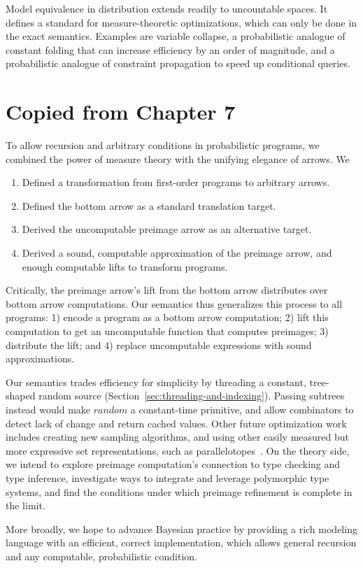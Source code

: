 Model equivalence in distribution extends readily to uncountable spaces. It defines a standard for measure-theoretic optimizations, which can only be done in the exact semantics. Examples are variable collapse, a probabilistic analogue of constant folding that can increase efficiency by an order of magnitude, and a probabilistic analogue of constraint propagation to speed up conditional queries.

\section{Copied from Chapter 7}

To allow recursion and arbitrary conditions in probabilistic programs, we combined the power of measure theory with the unifying elegance of arrows. We
\begin{enumerate}
	\item Defined a transformation from first-order programs to arbitrary arrows.
	\item Defined the bottom arrow as a standard translation target.
	\item Derived the uncomputable preimage arrow as an alternative target.
	\item Derived a sound, computable approximation of the preimage arrow, and enough computable lifts to transform programs.
\end{enumerate}
Critically, the preimage arrow's lift from the bottom arrow distributes over bottom arrow computations.
Our semantics thus generalizes this process to all programs: 1) encode a program as a bottom arrow computation; 2) lift this computation to get an uncomputable function that computes preimages; 3) distribute the lift; and 4) replace uncomputable expressions with sound approximations.

Our semantics trades efficiency for simplicity by threading a constant, tree-shaped random source (Section~\ref{sec:threading-and-indexing}).
Passing subtrees instead would make $random$ a constant-time primitive, and allow combinators to detect lack of change and return cached values.
Other future optimization work includes creating new sampling algorithms, and using other easily measured but more expressive set representations, such as parallelotopes~\cite{cit:amato-2012tcs-parallelotopes}.
On the theory side, we intend to explore preimage computation's connection to type checking and type inference, investigate ways to integrate and leverage polymorphic type systems, and find the conditions under which preimage refinement is complete in the limit.

More broadly, we hope to advance Bayesian practice by providing a rich modeling language with an efficient, correct implementation, which allows general recursion and any computable, probabilistic condition.
